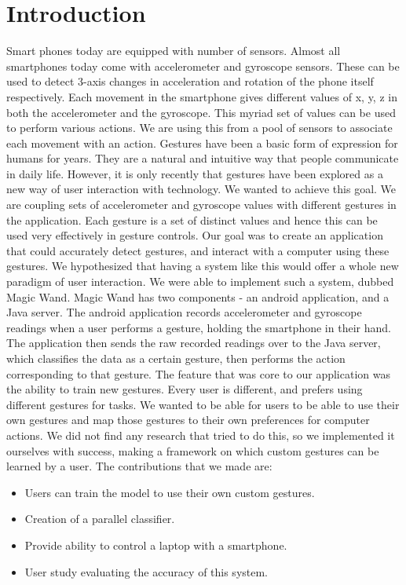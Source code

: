 \documentclass{sigchi}
\begin{document}
\section{Introduction}

Smart phones today are equipped with number of sensors. Almost all smartphones today come with accelerometer and gyroscope sensors. These can be used to detect 3-axis changes in acceleration and rotation of the phone itself respectively. Each movement in the smartphone gives different values of x, y, z in both the accelerometer and the gyroscope. This myriad set of values can be used to perform various actions. We are using this from a pool of sensors to associate each movement with an action. Gestures have been a basic form of expression for humans for years. They are a natural and intuitive way that people communicate in daily life. However, it is only recently that gestures have been explored as a new way of user interaction with technology. We wanted to achieve this goal. We are coupling sets of accelerometer and gyroscope values with different gestures in the application. Each gesture is a set of distinct values and hence this can be used very effectively in gesture controls. Our goal was to create an application that could accurately detect gestures, and interact with a computer using these gestures. We hypothesized that having a system like this would offer a whole new paradigm of user interaction. We were able to implement such a system, dubbed Magic Wand. Magic Wand has two components - an android application, and a Java server. The android application records accelerometer and gyroscope readings when a user performs a gesture, holding the smartphone in their hand. The application then sends the raw recorded readings over to the Java server, which classifies the data as a certain gesture, then performs the action corresponding to that gesture. The feature that was core to our application was the ability to train new gestures. Every user is different, and prefers using different gestures for tasks. We wanted to be able for users to be able to use their own gestures and map those gestures to their own preferences for computer actions. We did not find any research that tried to do this, so we implemented it ourselves with success, making a framework on which custom gestures can be learned by a user. The contributions that we made are:
\begin{itemize}
\item Users can train the model to use their own custom gestures.
\item Creation of a parallel classifier.
\item Provide ability to control a laptop with a smartphone.
\item User study evaluating the accuracy of this system.
\end{itemize}
\end{document}
